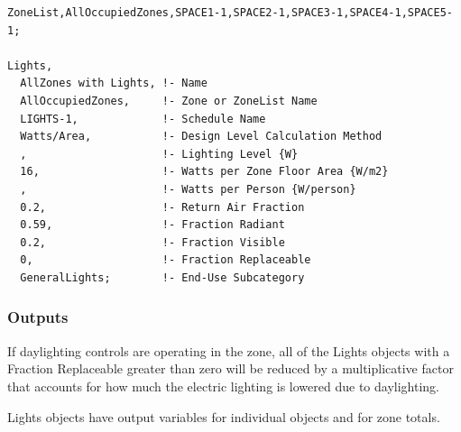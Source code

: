 \begin{lstlisting}
ZoneList,AllOccupiedZones,SPACE1-1,SPACE2-1,SPACE3-1,SPACE4-1,SPACE5-1;

Lights,
  AllZones with Lights, !- Name
  AllOccupiedZones,     !- Zone or ZoneList Name
  LIGHTS-1,             !- Schedule Name
  Watts/Area,           !- Design Level Calculation Method
  ,                     !- Lighting Level {W}
  16,                   !- Watts per Zone Floor Area {W/m2}
  ,                     !- Watts per Person {W/person}
  0.2,                  !- Return Air Fraction
  0.59,                 !- Fraction Radiant
  0.2,                  !- Fraction Visible
  0,                    !- Fraction Replaceable
  GeneralLights;        !- End-Use Subcategory
\end{lstlisting}

\subsubsection{Outputs}\label{outputs-2-012}

If daylighting controls are operating in the zone, all of the Lights objects with a Fraction Replaceable greater than zero will be reduced by a multiplicative factor that accounts for how much the electric lighting is lowered due to daylighting.

Lights objects have output variables for individual objects and for zone totals.

